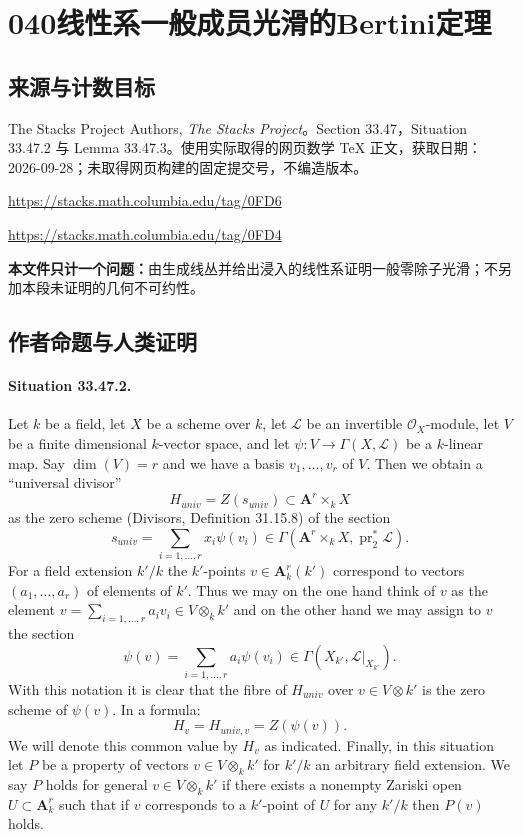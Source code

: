 \documentclass[UTF8,11pt]{ctexart}
\theoremstyle{definition}
\begin{document}
\section*{040\quad 线性系一般成员光滑的Bertini定理}
\subsection*{来源与计数目标}
The Stacks Project Authors, \emph{The Stacks Project}。Section 33.47，Situation 33.47.2 与 Lemma 33.47.3。使用实际取得的网页数学 TeX 正文，获取日期：2026-09-28；未取得网页构建的固定提交号，不编造版本。
\par\url{https://stacks.math.columbia.edu/tag/0FD6}
\par\url{https://stacks.math.columbia.edu/tag/0FD4}

\par\textbf{本文件只计一个问题：}由生成线丛并给出浸入的线性系证明一般零除子光滑；不另加本段未证明的几何不可约性。
\subsection*{作者命题与人类证明}

\paragraph{Situation 33.47.2.}
Let $k$ be a field, let $X$ be a scheme over $k$, let $\mathcal L$ be an invertible $\mathcal O_X$-module, let $V$ be a finite dimensional $k$-vector space, and let $\psi:V\to\Gamma(X,\mathcal L)$ be a $k$-linear map. Say $\dim(V)=r$ and we have a basis $v_1,\ldots,v_r$ of $V$. Then we obtain a ``universal divisor''
\[H_{univ}=Z(s_{univ})\subset\mathbf A^r\times_k X\]
as the zero scheme (Divisors, Definition 31.15.8) of the section
\[s_{univ}=\sum_{i=1,\ldots,r}x_i\psi(v_i)\in\Gamma(\mathbf A^r\times_k X,\operatorname{pr}_2^*\mathcal L).\]
For a field extension $k'/k$ the $k'$-points $v\in\mathbf A^r_k(k')$ correspond to vectors $(a_1,\ldots,a_r)$ of elements of $k'$. Thus we may on the one hand think of $v$ as the element $v=\sum_{i=1,\ldots,r}a_iv_i\in V\otimes_k k'$ and on the other hand we may assign to $v$ the section
\[\psi(v)=\sum_{i=1,\ldots,r}a_i\psi(v_i)\in\Gamma(X_{k'},\mathcal L|_{X_{k'}}).\]
With this notation it is clear that the fibre of $H_{univ}$ over $v\in V\otimes k'$ is the zero scheme of $\psi(v)$. In a formula:
\[H_v=H_{univ,v}=Z(\psi(v)).\]
We will denote this common value by $H_v$ as indicated. Finally, in this situation let $P$ be a property of vectors $v\in V\otimes_k k'$ for $k'/k$ an arbitrary field extension. We say $P$ holds for general $v\in V\otimes_k k'$ if there exists a nonempty Zariski open $U\subset\mathbf A^r_k$ such that if $v$ corresponds to a $k'$-point of $U$ for any $k'/k$ then $P(v)$ holds.
\end{document}
